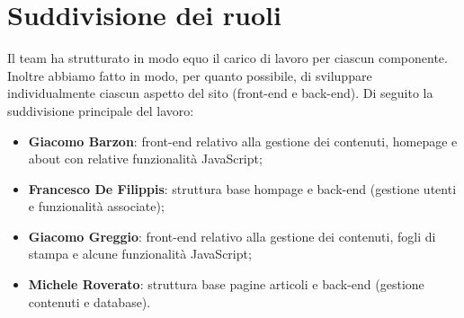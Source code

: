 \documentclass[12pt]{article}
\begin{document}
	\newpage
	
	\section{Suddivisione dei ruoli}
	Il team ha strutturato in modo equo il carico di lavoro per ciascun componente. Inoltre abbiamo fatto in modo, per quanto possibile, di sviluppare individualmente ciascun aspetto del sito (front-end e back-end). Di seguito la suddivisione principale del lavoro:
	\begin{itemize}
		\item \textbf{Giacomo Barzon}: front-end relativo alla gestione dei contenuti, homepage e about con relative funzionalità JavaScript;
		\item \textbf{Francesco De Filippis}: struttura base hompage e back-end (gestione utenti e funzionalità associate);
		\item \textbf{Giacomo Greggio}: front-end relativo alla gestione dei contenuti, fogli di stampa e alcune funzionalità JavaScript;
		\item \textbf{Michele Roverato}: struttura base pagine articoli e back-end (gestione contenuti e database).
	\end{itemize}
\end{document}
